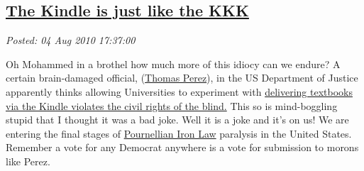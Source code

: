 %

\subsection*{\href{http://bakerjd99.wordpress.com/2010/08/04/the-kindle-is-just-like-the-kkk/}{The Kindle is just like the KKK}}


\noindent\emph{Posted: 04 Aug 2010 17:37:00}
\vspace{6pt}

Oh Mohammed in a brothel how much more of this idiocy can we endure? A
certain brain-damaged official,
(\href{http://en.wikipedia.org/wiki/Thomas\_Perez}{Thomas Perez}), in
the US Department of Justice apparently thinks allowing Universities to
experiment with
\href{http://www.washingtonexaminer.com/politics/Why-did-feds-claim-Kindle-violates-civil-rights\_-1006723-99801389.html}{delivering
textbooks via the Kindle violates the civil rights of the blind.} This
so is mind-boggling stupid that I thought it was a bad joke. Well it is
a joke and it's on us! We are entering the final stages of
\href{http://en.wikipedia.org/wiki/Jerry\_Pournelle}{Pournellian Iron
Law} paralysis in the United States. Remember a vote for any Democrat
anywhere is a vote for submission to morons like Perez.



%